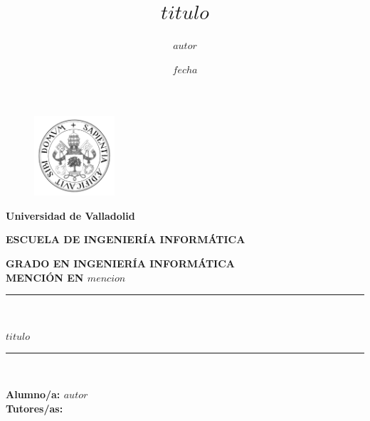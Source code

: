 \date{$fecha$}
\author{$autor$}
\title{$titulo$}


    \begin{titlepage}
        \begin{center}
            \vspace*{-1in}
            \begin{figure}[htb]
                \begin{center}
                    \includegraphics[width=3cm]{./latex/img/logo}
                \end{center}
            \end{figure}
            \begin{large}
                \textbf{Universidad de Valladolid}
            \end{large}

            \vspace*{0.15in}
            \vspace*{0.6in}
            \begin{large}
                \textbf{ESCUELA DE INGENIERÍA INFORMÁTICA}
            \end{large}
            \vspace*{0.2in}
            \textbf{ GRADO EN INGENIERÍA INFORMÁTICA}\\
            \textbf{ MENCIÓN EN $mencion$ }
            \vspace*{0.5in}
            \rule{140mm}{0.1mm}\\
            \vspace*{0.3in}
            \begin{large}
                \textbf{{\LARGE $titulo$\\}}
            \end{large}
            \vspace*{0.6in}
            \rule{140mm}{0.1mm}\\
            \vspace*{2in}
            \begin{large}
                \begin{flushright}
                    \textbf{Alumno/a: $autor$ \\
                    \vspace*{0.3in}
                    Tutores/as: }
                \end{flushright}
            \end{large}
        \end{center}
    \end{titlepage}

